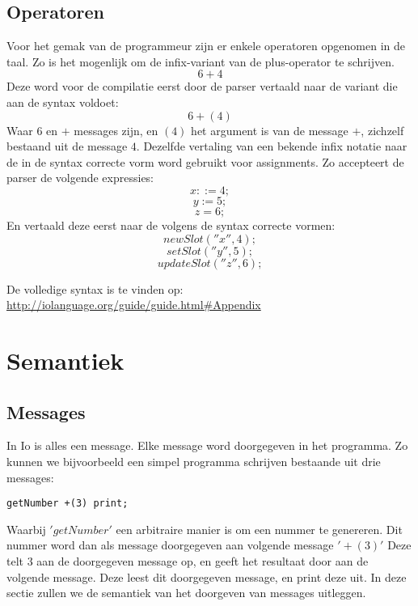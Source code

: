 \documentclass[12pt]{article}
\begin{document}
\subsection{Operatoren}
Voor het gemak van de programmeur zijn er enkele operatoren opgenomen in de taal. Zo is het mogenlijk om de infix-variant van de plus-operator te schrijven.
\[6 + 4\]
Deze word voor de compilatie eerst door de parser vertaald naar de variant die aan de syntax voldoet:
\[6 +(4)\]
Waar \(6\) en \(+\) messages zijn, en \( (4) \) het argument is van de message \(+\), zichzelf bestaand uit de message \(4\). Dezelfde vertaling van een bekende infix notatie naar de in de syntax correcte vorm word gebruikt voor assignments. Zo accepteert de parser de volgende expressies:
\[x ::= 4;\]
\[y := 5;\]
\[z = 6;\]
En vertaald deze eerst naar de volgens de syntax correcte vormen:
\[newSlot(''x'', 4);\]
\[setSlot(''y'', 5);\]
\[updateSlot(''z'', 6);\]

De volledige syntax is te vinden op: \url{http://iolanguage.org/guide/guide.html#Appendix}

\section{Semantiek}

\subsection{Messages}
In Io is alles een message. Elke message word doorgegeven in het programma. Zo kunnen we bijvoorbeeld een simpel programma schrijven bestaande uit drie messages:
\begin{lstlisting}[frame=single]
getNumber +(3) print;
\end{lstlisting}
Waarbij \('getNumber'\) een arbitraire manier is om een nummer te genereren. Dit nummer word dan als message doorgegeven aan volgende message \('+(3)'\) Deze telt \(3\) aan de doorgegeven message op, en geeft het resultaat door aan de volgende message. Deze leest dit doorgegeven message, en print deze uit.
In deze sectie zullen we de semantiek van het doorgeven van messages uitleggen.
\end{document}

